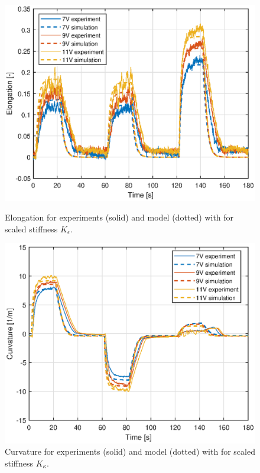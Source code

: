 \begin{figure}[H] 
    \begin{minipage}[b]{0.49\linewidth}
     \centering
    \includegraphics[width=\linewidth]{Figures/Chapter5/elongfit.eps} 
    \caption{Elongation for experiments (solid) and model (dotted) with for scaled stiffness $K_\epsilon$. } 
    \label{fig5:elong} 
       \end{minipage} 
    \begin{minipage}[b]{0.49\linewidth}
     \centering
    \includegraphics[width=\linewidth]{Figures/Chapter5/curvaturefit.eps} 
    \caption{Curvature for experiments (solid) and model (dotted) with for scaled stiffness $K_\kappa$. } 
    \label{fig5:kappa} 
    \end{minipage} 
\end{figure}

